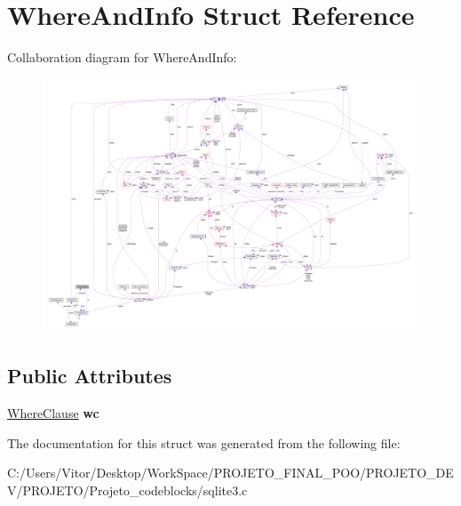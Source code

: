 \hypertarget{struct_where_and_info}{\section{Where\-And\-Info Struct Reference}
\label{struct_where_and_info}
}


Collaboration diagram for Where\-And\-Info\-:\nopagebreak
\begin{figure}[H]
\begin{center}
\leavevmode
\includegraphics[width=350pt]{struct_where_and_info__coll__graph}
\end{center}
\end{figure}
\subsection*{Public Attributes}
\begin{DoxyCompactItemize}
\item 
\hypertarget{struct_where_and_info_a01cea99f069b1e598004a1cd0d0c3a80}{\hyperlink{struct_where_clause}{Where\-Clause} {\bfseries wc}}\label{struct_where_and_info_a01cea99f069b1e598004a1cd0d0c3a80}

\end{DoxyCompactItemize}


The documentation for this struct was generated from the following file\-:\begin{DoxyCompactItemize}
\item 
C\-:/\-Users/\-Vitor/\-Desktop/\-Work\-Space/\-P\-R\-O\-J\-E\-T\-O\-\_\-\-F\-I\-N\-A\-L\-\_\-\-P\-O\-O/\-P\-R\-O\-J\-E\-T\-O\-\_\-\-D\-E\-V/\-P\-R\-O\-J\-E\-T\-O/\-Projeto\-\_\-codeblocks/sqlite3.\-c\end{DoxyCompactItemize}
